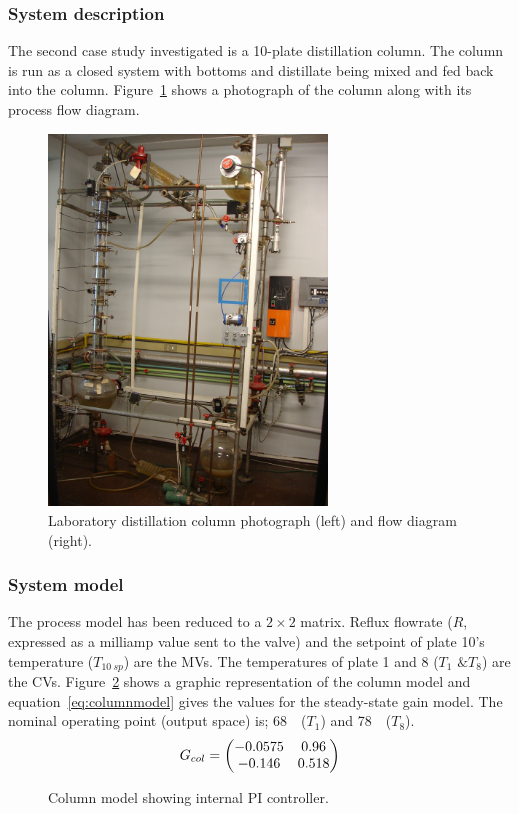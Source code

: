 \subsubsection{System description}
The second case study investigated is a 10-plate distillation column.
The column is run as a closed system with bottoms and distillate being mixed and fed back into the column.
Figure~\ref{fig:columnphoto} shows a photograph of the column along with its process flow diagram.
\begin{figure}[htbp]
  \centering
    \includegraphics[width=7.4cm]{graph/columnphoto.jpg}
    \scalebox{1}{}  
  \caption[Laboratory distillation column photograph and flow diagram]{Laboratory distillation column photograph (left) and flow diagram (right).}
  \label{fig:columnphoto}
\end{figure}

\subsubsection{System model}
The process model has been reduced to a $2\times2$ matrix.
Reflux flowrate ($R$, expressed as a milliamp value sent to the valve) and the setpoint of plate 10's temperature ($T_{10~sp}$) are the MVs.
The temperatures of plate 1 and 8 ($T_1\text{ \& }T_{8}$) are the CVs.
Figure~\ref{fig:columnmodel} shows a graphic representation of the column model and equation~\ref{eq:columnmodel} gives the values for the steady-state gain model.
The nominal operating point (output space) is; 68~\textcelsius\ ($T_1$) and 78~\textcelsius\ ($T_8$).
\begin{equation}
  \label{eq:columnmodel}
  G_{col} = \bpm -0.0575 & 0.96 \\       %
                -0.146  & 0.518 \\ \epm %
\end{equation}
\begin{figure}[htbp]
  \centering
    \scalebox{1}{}  
  \caption[Column model]{Column model showing internal PI controller.}
  \label{fig:columnmodel}
\end{figure}

